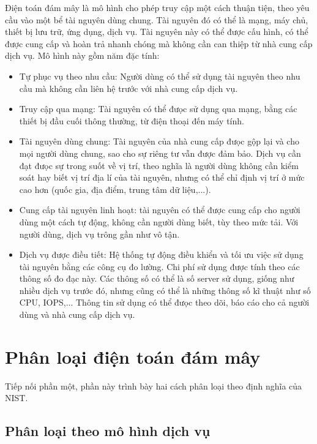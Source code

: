 \documentclass{article}
\begin{document}
Điện toán đám mây là mô hình cho phép truy cập một cách thuận tiện, theo yêu cầu
vào một bể tài nguyên dùng chung. Tài nguyên đó có thể là mạng, máy chủ, thiết
bị lưu trữ, ứng dụng, dịch vụ. Tài nguyên này có thể được cấu hình, có thể được
cung cấp và hoàn trả nhanh chóng mà không cần can thiệp từ nhà cung cấp dịch vụ.
Mô hình này gồm năm đặc tính:

\begin{itemize}
    \item Tự phục vụ theo nhu cầu: Người dùng có thể sử dụng tài nguyên theo nhu
    cầu mà không cần liên hệ trước với nhà cung cấp dịch vụ.
    \item Truy cập qua mạng: Tài nguyên có thể đưọc sử dụng qua mạng, bằng các
    thiết bị đầu cuối thông thường, từ điện thoại đến máy tính.
    \item Tài nguyên dùng chung: Tài nguyên của nhà cung cấp đưọc gộp lại và cho
    mọi người dùng chung, sao cho sự riêng tư vẫn được đảm bảo. Dịch vụ cần đạt
    đưọc sự trong suốt về vị trí, theo nghĩa là người dùng không cần kiểm soát
    hay biết vị trí địa lí của tài nguyên, nhưng có thể chỉ định vị trí ở mức
    cao hơn (quốc gia, địa điểm, trung tâm dữ liệu,...).
    \item Cung cấp tài nguyên linh hoạt: tài nguyên có thể được cung cấp cho
    người dùng một cách tự động, không cần người dùng biết, tùy theo mức tải.
    Với người dùng, dịch vụ trông gần như vô tận.
    \item Dịch vụ được điều tiết: Hệ thống tự động điều khiển và tối ưu việc sử
    dụng tài nguyên bằng các công cụ đo lường. Chi phí sử dụng được tính theo
    các thông số đo đạc này. Các thông số có thể là số server sử dụng, giống như
    nhiều dịch vụ trước đó, nhưng cũng có thể là những thông số kĩ thuật như số
    CPU, IOPS,... Thông tin sử dụng có thể đưọc theo dõi, báo cáo cho cả người
    dùng và nhà cung cấp dịch vụ.
\end{itemize}

\section{Phân loại điện toán đám mây}

Tiếp nối phần một, phần này trình bày hai cách phân loại theo định nghĩa của
NIST.

\subsection{Phân loại theo mô hình dịch vụ}
\end{document}
